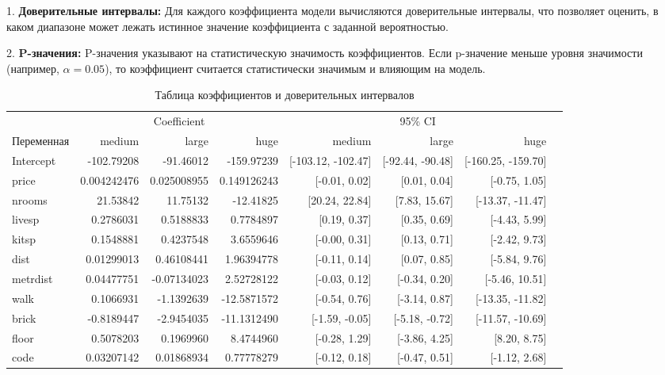 1. \textbf{Доверительные интервалы:} Для каждого коэффициента модели вычисляются доверительные интервалы, что позволяет оценить, в каком диапазоне может лежать истинное значение коэффициента с заданной вероятностью.

2. \textbf{P-значения:} P-значения указывают на статистическую значимость коэффициентов. Если p-значение меньше уровня значимости (например, \( \alpha = 0.05 \)), то коэффициент считается статистически значимым и влияющим на модель.




\begin{sidewaystable}
	\centering
	\caption{Таблица коэффициентов и доверительных интервалов}
	\begin{tabular}{lrrrrrrr}
		\toprule
		& \multicolumn{3}{c}{Coefficient} & \multicolumn{3}{c}{95\% CI} \\
		\cmidrule(lr){2-4} \cmidrule(lr){5-7}
		Переменная & medium & large & huge & medium & large & huge \\
		\midrule
		Intercept & -102.79208 & -91.46012 & -159.97239 & [-103.12, -102.47] & [-92.44, -90.48] & [-160.25, -159.70] \\
		price & 0.004242476 & 0.025008955 & 0.149126243 & [-0.01, 0.02] & [0.01, 0.04] & [-0.75, 1.05] \\
		nrooms & 21.53842 & 11.75132 & -12.41825 & [20.24, 22.84] & [7.83, 15.67] & [-13.37, -11.47] \\
		livesp & 0.2786031 & 0.5188833 & 0.7784897 & [0.19, 0.37] & [0.35, 0.69] & [-4.43, 5.99] \\
		kitsp & 0.1548881 & 0.4237548 & 3.6559646 & [-0.00, 0.31] & [0.13, 0.71] & [-2.42, 9.73] \\
		dist & 0.01299013 & 0.46108441 & 1.96394778 & [-0.11, 0.14] & [0.07, 0.85] & [-5.84, 9.76] \\
		metrdist & 0.04477751 & -0.07134023 & 2.52728122 & [-0.03, 0.12] & [-0.34, 0.20] & [-5.46, 10.51] \\
		walk & 0.1066931 & -1.1392639 & -12.5871572 & [-0.54, 0.76] & [-3.14, 0.87] & [-13.35, -11.82] \\
		brick & -0.8189447 & -2.9454035 & -11.1312490 & [-1.59, -0.05] & [-5.18, -0.72] & [-11.57, -10.69] \\
		floor & 0.5078203 & 0.1969960 & 8.4744960 & [-0.28, 1.29] & [-3.86, 4.25] & [8.20, 8.75] \\
		code & 0.03207142 & 0.01868934 & 0.77778279 & [-0.12, 0.18] & [-0.47, 0.51] & [-1.12, 2.68] \\
		\bottomrule
	\end{tabular}
\end{sidewaystable}

